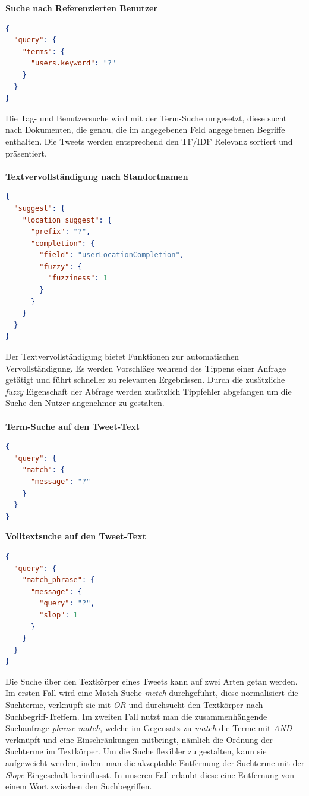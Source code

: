 \textbf{Suche nach Referenzierten Benutzer}
\begin{lstlisting}[language=json,firstnumber=1]
{
  "query": {
    "terms": {
      "users.keyword": "?"
    }
  }
}
\end{lstlisting}

Die Tag- und Benutzersuche wird mit der Term-Suche umgesetzt, diese sucht nach Dokumenten, die genau, die im angegebenen Feld angegebenen Begriffe enthalten. Die Tweets werden entsprechend den TF/IDF Relevanz sortiert und präsentiert.  
\\\\
\textbf{Textvervollständigung nach Standortnamen}
\begin{lstlisting}[language=json,firstnumber=1]
{
  "suggest": {
    "location_suggest": {
      "prefix": "?",
      "completion": {
        "field": "userLocationCompletion",
        "fuzzy": {
          "fuzziness": 1
        }
      }
    }
  }
}
\end{lstlisting}
Der Textvervollständigung bietet Funktionen zur automatischen Vervollständigung. Es werden Vorschläge wehrend des Tippens einer Anfrage getätigt und führt schneller zu relevanten Ergebnissen. Durch die zusätzliche \textit{fuzzy} Eigenschaft der Abfrage werden zusätzlich Tippfehler abgefangen um die Suche den Nutzer angenehmer zu gestalten.
\\\\
\textbf{Term-Suche auf den Tweet-Text}
\begin{lstlisting}[language=json,firstnumber=1]
{
  "query": {
    "match": {
      "message": "?"
    }
  }
}
\end{lstlisting}

\textbf{Volltextsuche auf den Tweet-Text}
\begin{lstlisting}[language=json,firstnumber=1]
{
  "query": {
    "match_phrase": {
      "message": {
        "query": "?",
        "slop": 1
      }
    }
  }
}
\end{lstlisting}

Die Suche über den Textkörper eines Tweets kann auf zwei Arten getan werden. Im ersten Fall wird eine Match-Suche \textit{metch} durchgeführt, diese normalisiert die Suchterme, verknüpft sie mit \textit{OR} und durchsucht den Textkörper nach Suchbegriff-Treffern. Im zweiten Fall nutzt man die zusammenhängende Suchanfrage \textit{phrase match}, welche im Gegensatz zu \textit{match} die Terme mit \textit{AND} verknüpft und eine Einschränkungen mitbringt, nämlich die Ordnung der Suchterme im Textkörper. Um die Suche flexibler zu gestalten, kann sie aufgeweicht werden, indem man die akzeptable Entfernung der Suchterme mit der \textit{Slope} Eingeschalt beeinflusst. In unseren Fall erlaubt diese eine Entfernung von einem Wort zwischen den Suchbegriffen.

